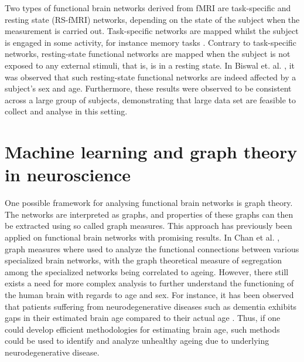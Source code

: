 Two types of functional brain networks derived from fMRI are task-specific and resting state (RS-fMRI) networks, depending on the state of the subject when the measurement is carried out. Task-specific networks are mapped whilst the subject is engaged in some activity, for instance memory tasks \cite{grady}. Contrary to task-specific networks, resting-state functional networks are mapped when the subject is not exposed to any external stimuli, that is, is in a resting state. In Biswal et. al. \cite{biswal}, it was observed that such resting-state functional networks are indeed affected by a subject's sex and age. Furthermore, these results were observed to be consistent across a large group of subjects, demonstrating that large data set are feasible to collect and analyse in this setting.

\section{Machine learning and graph theory in neuroscience}

One possible framework for analysing functional brain networks is graph theory. The networks are interpreted as graphs, and properties of these graphs can then be extracted using so called graph measures. This approach has previously been applied on functional brain networks with promising results. In Chan et al. \cite{chan}, graph measures where used to analyze the functional connections between various specialized brain networks, with the graph theoretical measure of segregation among the specialized networks being correlated to ageing. However, there still exists a need for more complex analysis to further understand the functioning of the human brain with regards to age and sex. For instance, it has been observed that patients suffering from neurodegenerative diseases such as dementia exhibits gaps in their estimated brain age compared to their actual age \cite{kaufmann}. Thus, if one could develop efficient methodologies for estimating brain age, such methods could be used to identify and analyze unhealthy ageing due to underlying neurodegenerative disease. 


